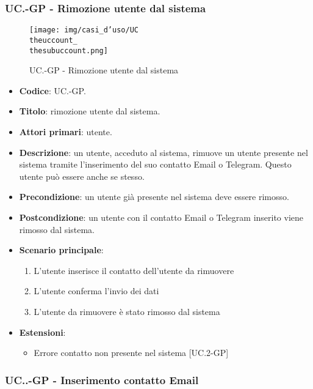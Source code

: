 	\subsubsection{UC\theuccount.\thesubuccount-GP - Rimozione utente dal sistema}
		\begin{figure}[H]
			\centering
			\texttt{[image: img/casi\_d'uso/UC\\theuccount\_\\thesubuccount.png]}\\
			\caption{UC\theuccount.\thesubuccount-GP - Rimozione utente dal sistema}
		\end{figure}
		\begin{itemize}
			\item \textbf{Codice}: UC\theuccount.\thesubuccount-GP.
			\item \textbf{Titolo}: rimozione utente dal sistema.
			\item \textbf{Attori primari}: utente.
			\item \textbf{Descrizione}: un utente, acceduto al sistema, rimuove un utente presente nel sistema tramite l'inserimento del suo contatto Email o Telegram. Questo utente può essere anche se stesso.
			\item \textbf{Precondizione}: un utente già presente nel sistema deve essere rimosso.
			\item \textbf{Postcondizione}: un utente con il contatto Email o Telegram inserito viene rimosso dal sistema.
			\item \textbf{Scenario principale}:
			\begin{enumerate}
				\item L'utente inserisce il contatto dell'utente da rimuovere
				\item L'utente conferma l'invio dei dati
				\item L'utente da rimuovere è stato rimosso dal sistema
			\end{enumerate}
			\item \textbf{Estensioni}:
			\begin{itemize}
				\item Errore contatto non presente nel sistema [UC\theuccount.2-GP]
			\end{itemize}
		\end{itemize}

			\subsubsection{UC\theuccount.\thesubuccount.\thesubsubuccount-GP - Inserimento contatto Email}

